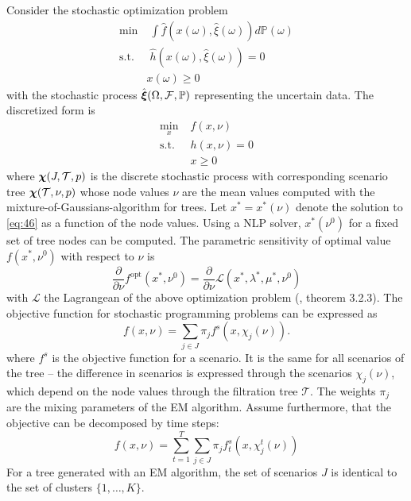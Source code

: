 Consider the stochastic optimization problem
\begin{subequations}
  \begin{align}
    \label{eq:49}
    \min&\;\int \hat{f}(x(\omega),\hat{\xi}(\omega))d\mathbb{P}(\omega)\\
    \text{s.t.}&\; \hat{h}(x(\omega),\hat{\xi}(\omega)) = 0\\
    &x(\omega)\geq 0
  \end{align}
\end{subequations}
with the stochastic process $\hat{\boldsymbol\xi}(\Omega, \mathcal{F}, \mathbb{P})$ representing the uncertain data.
The discretized form is\begin{subequations}\label{eq:46} \begin{align}
     \min\limits_{x}&\; f(x,\nu)\\
    \text{s.t.}&\; h(x,\nu) = 0\\
    &\; x \geq 0
  \end{align}
\end{subequations}
where $\boldsymbol\chi(J, \mathcal{T}, p)$ is the discrete stochastic process with corresponding scenario tree $\boldsymbol\chi(\mathcal{T}, \nu, p)$ whose node values $\nu$ are the mean values computed with the mixture-of-Gaussians-algorithm for trees.
Let $x^*=x^*(\nu)$ denote the solution to \eqref{eq:46} as a function of the node values.
Using a NLP solver, $x^*(\nu^0)$ for a fixed set of tree nodes can be computed.
The parametric sensitivity of optimal value $f(x^*,\nu^0)$ with respect to $\nu$ is
\begin{equation}
  \label{eq:47}
  \frac{\partial }{\partial \nu}f^{\mathrm{opt}}(x^*,\nu^0) =  \frac{\partial }{\partial \nu}\mathcal{L}(x^*,\lambda^*, \mu^*,\nu^0)
\end{equation}
with $\mathcal{L}$ the Lagrangean of the above optimization problem (\citet{Jongen2004}, theorem 3.2.3).
The objective function for stochastic programming problems can be expressed as
\begin{equation}
  \label{eq:45}
  f(x,\nu) = \sum_{j\in J} \pi_jf^s(x,\chi_j(\nu)).
\end{equation}
where $f^s$ is the objective function for a scenario.
It is the same for all scenarios of the tree -- the difference in scenarios is expressed through the scenarios $\chi_j(\nu)$, which depend on the node values through the filtration tree $\mathcal{T}$.
The weights $\pi_j$ are the mixing parameters of the EM algorithm.
Assume furthermore, that the objective can be decomposed by time steps:
\begin{equation}
  \label{eq:48}
  f(x,\nu) = \sum_{t=1}^T\sum_{j\in J}\pi_jf_{t}^s(x,\chi_{j}^t(\nu))
\end{equation}
For a tree generated with an EM algorithm, the set of scenarios $J$ is identical to the set of clusters $\{1,\ldots,K\}$.


